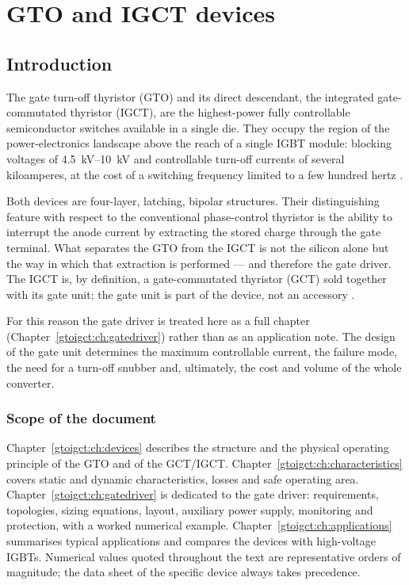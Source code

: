 \chapter{GTO and IGCT devices}
\label{ch:gtoigct}
\section{Introduction}

The gate turn-off thyristor (GTO) and its direct descendant, the integrated
gate-commutated thyristor (IGCT), are the highest-power fully controllable
semiconductor switches available in a single die. They occupy the region of the
power-electronics landscape above the reach of a single IGBT module: blocking
voltages of \SIrange{4.5}{10}{\kilo\volt} and controllable turn-off currents of
several kiloamperes, at the cost of a switching frequency limited to a few
hundred hertz \cite{bernet2000,rodriguez2007multilevel}.

Both devices are four-layer, latching, bipolar structures. Their distinguishing
feature with respect to the conventional phase-control thyristor is the ability
to interrupt the anode current by extracting the stored charge through the gate
terminal. What separates the GTO from the IGCT is not the silicon alone but the
way in which that extraction is performed --- and therefore the gate driver.
The IGCT is, by definition, a gate-commutated thyristor (GCT) sold together with
its gate unit; the gate unit is part of the device, not an accessory
\cite{klaka1997igct,carroll1997igct}.

For this reason the gate driver is treated here as a full chapter
(Chapter~\ref{gtoigct:ch:gatedriver}) rather than as an application note. The design of
the gate unit determines the maximum controllable current, the failure mode, the
need for a turn-off snubber and, ultimately, the cost and volume of the whole
converter.

\subsection{Scope of the document}

Chapter~\ref{gtoigct:ch:devices} describes the structure and the physical operating
principle of the GTO and of the GCT/IGCT. Chapter~\ref{gtoigct:ch:characteristics}
covers static and dynamic characteristics, losses and safe operating area.
Chapter~\ref{gtoigct:ch:gatedriver} is dedicated to the gate driver: requirements,
topologies, sizing equations, layout, auxiliary power supply, monitoring and
protection, with a worked numerical example. Chapter~\ref{gtoigct:ch:applications}
summarises typical applications and compares the devices with high-voltage
IGBTs. Numerical values quoted throughout the text are representative orders of
magnitude; the data sheet of the specific device always takes precedence.

